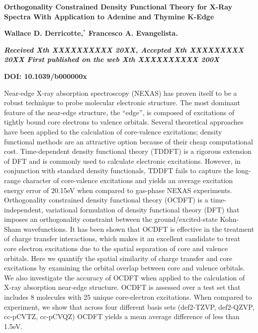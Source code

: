 \documentclass[11.5pt]{article}
\begin{document}
\noindent\LARGE{\textbf{Orthogonality Constrained Density Functional Theory for X-Ray Spectra With Application to Adenine and Thymine K-Edge}}
\vspace{0.6cm}

\noindent\large{\textbf{Wallace D. Derricotte,$^{\ast}$ Francesco A. Evangelista.}}\vspace{0.5cm}


\noindent\textit{\small{\textbf{Received Xth XXXXXXXXXX 20XX, Accepted Xth XXXXXXXXX 20XX\newline
First published on the web Xth XXXXXXXXXX 200X}}}

\noindent \textbf{\small{DOI: 10.1039/b000000x}}
\vspace{0.6cm}

\noindent \normalsize{ Near-edge X-ray absorption spectroscopy (NEXAS) has proven itself to be a robust technique to probe molecular electronic structure. The most dominant feature of the near-edge structure, the “edge'', is composed of excitations of tightly bound core electrons to valence orbitals. Several theoretical approaches have been applied to the calculation of core-valence excitations; density functional methods are an attractive option because of their cheap computational cost. Time-dependent density functional theory (TDDFT) is a rigorous extension of DFT and is commonly used to calculate electronic excitations. However, in conjunction with standard density functionals, TDDFT fails to capture the long-range character of core-valence excitations and yields an average excitation energy error of 20.15eV when compared to gas-phase NEXAS experiments. Orthogonality constrained density functional theory (OCDFT) is a time-independent, variational formulation of density functional theory (DFT) that imposes an orthogonality constraint between the ground/excited-state Kohn-Sham wavefunctions. It has been shown that OCDFT is effective in the treatment of charge transfer interactions, which makes it an excellent candidate to treat core electron excitations due to the spatial separation of core and valence orbitals. Here we quantify the spatial similarity of charge transfer and core excitations by examining the orbital overlap between core and valence orbitals. We also investigate the accuracy of OCDFT when applied to the calculation of X-ray absorption near-edge structure. OCDFT is assessed over a test set that includes 8 molecules with 25 unique core-electron excitations. When compared to experiment, we show that across four different basis sets (def2-TZVP, def2-QZVP, cc-pCVTZ, cc-pCVQZ) OCDFT yields a mean average difference of less than 1.5eV. }
\vspace{0.5cm}
\end{document}
